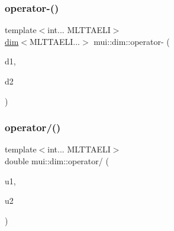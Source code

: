 \subsubsection{\texorpdfstring{operator-\/()}{operator-()}\hspace{0.1cm}{\footnotesize\ttfamily [3/3]}}
{\footnotesize\ttfamily template$<$int... M\+L\+T\+T\+A\+E\+LI$>$ \\
\hyperlink{structmui_1_1dim_1_1dim}{dim}$<$M\+L\+T\+T\+A\+E\+L\+I...$>$ mui\+::dim\+::operator-\/ (\begin{DoxyParamCaption}\item[{const \hyperlink{structmui_1_1dim_1_1dim}{dim}$<$ M\+L\+T\+T\+A\+E\+L\+I... $>$ \&}]{d1,  }\item[{const \hyperlink{structmui_1_1dim_1_1dim}{dim}$<$ M\+L\+T\+T\+A\+E\+L\+I... $>$ \&}]{d2 }\end{DoxyParamCaption})\hspace{0.3cm}{\ttfamily [inline]}}

\mbox{\label{namespacemui_1_1dim_a4c26075444e27914b56a4decef520e36}} 
\subsubsection{\texorpdfstring{operator/()}{operator/()}\hspace{0.1cm}{\footnotesize\ttfamily [1/4]}}
{\footnotesize\ttfamily template$<$int... M\+L\+T\+T\+A\+E\+LI$>$ \\
double mui\+::dim\+::operator/ (\begin{DoxyParamCaption}\item[{const \hyperlink{structmui_1_1dim_1_1dim}{dim}$<$ M\+L\+T\+T\+A\+E\+L\+I... $>$ \&}]{u1,  }\item[{const \hyperlink{structmui_1_1dim_1_1dim}{dim}$<$ M\+L\+T\+T\+A\+E\+L\+I... $>$ \&}]{u2 }\end{DoxyParamCaption})\hspace{0.3cm}{\ttfamily [inline]}}

\mbox{\label{namespacemui_1_1dim_afb08a9623e695fe5e68738decb7c5ea9}} 
